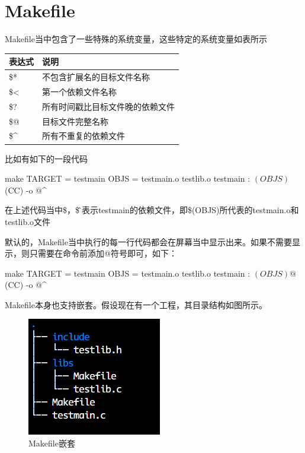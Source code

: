 \section{Makefile}
Makefile当中包含了一些特殊的系统变量，这些特定的系统变量如表所示
\begin{center}
  \begin{tabularx}{\textwidth}{|X|X|}
  \hline
  表达式& 说明\\ \hline
  \$* & 不包含扩展名的目标文件名称 \\
  \$< & 第一个依赖文件名称\\
  \$? & 所有时间戳比目标文件晚的依赖文件\\
  \$@ & 目标文件完整名称\\
  \$\^{} & 所有不重复的依赖文件\\ \hline
  \end{tabularx}
  \label{tab:macro_of_makefile}
\end{center}

比如有如下的一段代码
\begin{code-block}{make}
TARGET = testmain
OBJS = testmain.o testlib.o
testmain : $(OBJS)
        $(CC) -o $@ $^
\end{code-block}

在上述代码当中\$，\$\^则表示testmain的依赖文件，即\$(OBJS)所代表的testmain.o和testlib.o文件

默认的，Makefile当中执行的每一行代码都会在屏幕当中显示出来。如果不需要显示，则只需要在命令前添加@符号即可，如下：
\begin{code-block}{make}
TARGET = testmain
OBJS = testmain.o testlib.o
testmain : $(OBJS)
        @$(CC) -o $@ $^
\end{code-block}

Makefile本身也支持嵌套。假设现在有一个工程，其目录结构如图所示。
\begin{figure}[H]
  \centering
  \includegraphics[scale=0.8]{make.png}
  \caption{Makefile嵌套}
  \label{fig:submake}
\end{figure}

